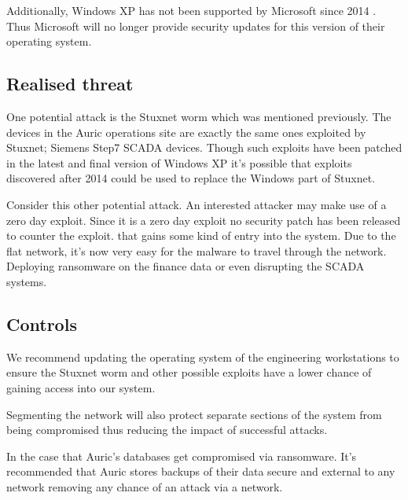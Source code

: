 \documentclass{article}
\begin{document}
\begin{multicols}{2}
    Additionally, 
    Windows XP has not been supported by Microsoft since 2014 \cite{windowsxp}.
    Thus Microsoft will no longer provide security updates for this version of their
    operating system. 

    \subsection{Realised threat}
    One potential attack is
    the Stuxnet worm which was mentioned previously. The devices in the Auric
    operations site are exactly the same ones exploited by Stuxnet; Siemens
    Step7 SCADA devices. Though such exploits have been patched in the latest
    and final
    version of Windows XP it's possible that exploits discovered after 2014 
    could be used to replace the Windows part of Stuxnet.

    Consider this other potential attack.
    An interested attacker may make use of a zero day exploit.
    Since it is a zero day exploit no security patch has been released to
    counter the exploit. that gains some
    kind of entry into the system.
    Due to the flat network,
    it's now very easy for the malware to travel
    through the network. Deploying ransomware on the finance data or even disrupting
    the SCADA systems.

    \subsection{Controls}
    We recommend updating the operating system of the
    engineering workstations to ensure
    the Stuxnet worm and other possible exploits have a lower chance of gaining
    access into our system.

    Segmenting the network will also protect separate sections of the system
    from being compromised thus reducing the impact of successful attacks.

    In the case that Auric's databases get compromised via ransomware.
    It's recommended that Auric stores backups of their
    data secure and external to any
    network removing any chance of an attack via a network.



\end{multicols}
\end{document}

